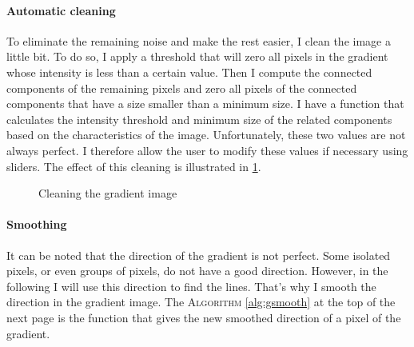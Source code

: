 \documentclass[11pt]{article}
\begin{document}
	\paragraph{Automatic cleaning}
	To eliminate the remaining noise and make the rest easier, I clean the image a little bit. To do so, I apply a threshold that will zero all pixels in the gradient whose intensity is less than a certain value. Then I compute the connected components of the remaining pixels and zero all pixels of the connected components that have a size smaller than a minimum size. I have a function that calculates the intensity threshold and minimum size of the related components based on the characteristics of the image. Unfortunately, these two values are not always perfect. I therefore allow the user to modify these values if necessary using sliders. The effect of this cleaning is illustrated in \figurename \ref{im:clean}.
	
	\begin{figure}[h]
		\centering
		\vspace{-1mm}
		\caption{Cleaning the gradient image}
		\label{im:clean}
	\end{figure}

	\paragraph{Smoothing}
	It can be noted that the direction of the gradient is not perfect. Some isolated pixels, or even groups of pixels, do not have a good direction. However, in the following I will use this direction to find the lines. That's why I smooth the direction in the gradient image. The \textsc{Algorithm} \ref{alg:gsmooth} at the top of the next page is the function that gives the new smoothed direction of a pixel of the gradient.
	
\end{document}
